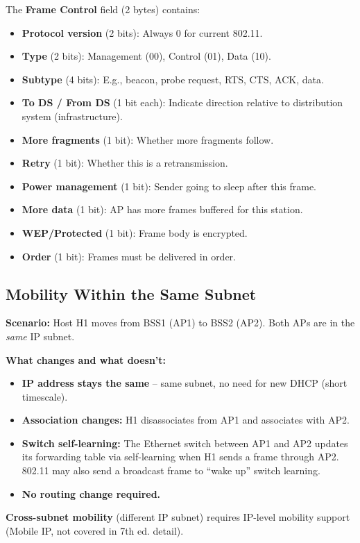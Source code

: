 \begin{keybox}
The \textbf{Frame Control} field (2 bytes) contains:
\begin{itemize}[noitemsep]
    \item \textbf{Protocol version} (2 bits): Always 0 for current 802.11.
    \item \textbf{Type} (2 bits): Management (00), Control (01), Data (10).
    \item \textbf{Subtype} (4 bits): E.g., beacon, probe request, RTS, CTS, ACK, data.
    \item \textbf{To DS / From DS} (1 bit each): Indicate direction relative to distribution system (infrastructure).
    \item \textbf{More fragments} (1 bit): Whether more fragments follow.
    \item \textbf{Retry} (1 bit): Whether this is a retransmission.
    \item \textbf{Power management} (1 bit): Sender going to sleep after this frame.
    \item \textbf{More data} (1 bit): AP has more frames buffered for this station.
    \item \textbf{WEP/Protected} (1 bit): Frame body is encrypted.
    \item \textbf{Order} (1 bit): Frames must be delivered in order.
\end{itemize}
\end{keybox}

\begin{imagebox}
\end{imagebox}

\subsection{Mobility Within the Same Subnet}

\begin{keybox}
\textbf{Scenario:} Host H1 moves from BSS1 (AP1) to BSS2 (AP2). Both APs are in the \emph{same} IP subnet.

\medskip
\textbf{What changes and what doesn't:}
\begin{itemize}[noitemsep]
    \item \textbf{IP address stays the same} -- same subnet, no need for new DHCP (short timescale).
    \item \textbf{Association changes:} H1 disassociates from AP1 and associates with AP2.
    \item \textbf{Switch self-learning:} The Ethernet switch between AP1 and AP2 updates its forwarding table via self-learning when H1 sends a frame through AP2. 802.11 may also send a broadcast frame to ``wake up'' switch learning.
    \item \textbf{No routing change required.}
\end{itemize}

\textbf{Cross-subnet mobility} (different IP subnet) requires IP-level mobility support (Mobile IP, not covered in 7th ed. detail).
\end{keybox}

